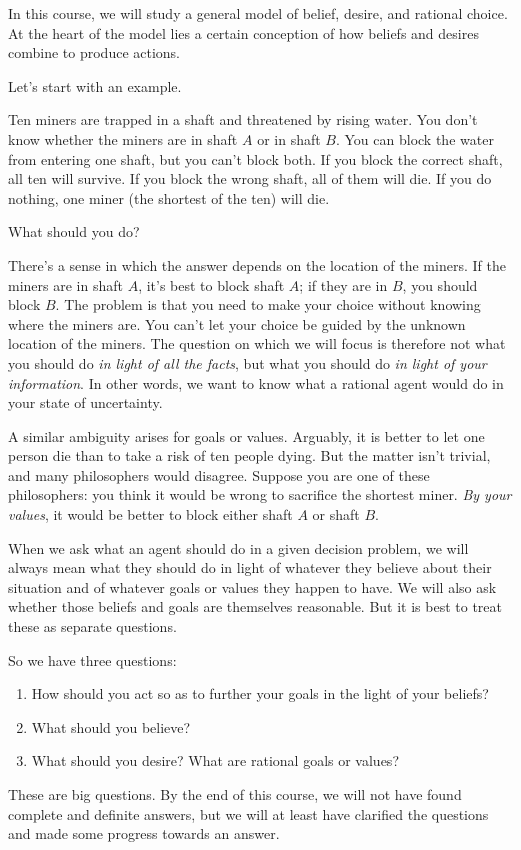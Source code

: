 In this course, we will study a general model of belief, desire, and
rational choice. At the heart of the model lies a certain conception
of how beliefs and desires combine to produce actions.

Let's start with an example.
%
\begin{example}\label{ex:miners}
  Ten miners are trapped in a shaft and threatened by rising water.
  You don't know whether the miners are in shaft $A$ or in shaft
  $B$. You can block the water from entering one shaft, but you can't
  block both. If you block the correct shaft, all ten will survive.
  If you block the wrong shaft, all of them will die. If you do
  nothing, one miner (the shortest of the ten) will die.
\end{example}

What should you do?

There's a sense in which the answer depends on the location of the
miners. If the miners are in shaft $A$, it's best to block shaft $A$;
if they are in $B$, you should block $B$. The problem is that you need
to make your choice without knowing where the miners are. You can't
let your choice be guided by the unknown location of the miners. The
question on which we will focus is therefore not what you should do
\emph{in light of all the facts}, but what you should do \emph{in
  light of your information}. In other words, we want to know what a
rational agent would do in your state of uncertainty.

A similar ambiguity arises for goals or values. Arguably, it is better
to let one person die than to take a risk of ten people dying. But the
matter isn't trivial, and many philosophers would disagree. Suppose
you are one of these philosophers: you think it would be wrong to
sacrifice the shortest miner. \emph{By your values}, it would be
better to block either shaft $A$ or shaft $B$.

When we ask what an agent should do in a given decision problem, we
will always mean what they should do in light of whatever they believe
about their situation and of whatever goals or values they happen to
have. We will also ask whether those beliefs and goals are themselves
reasonable. But it is best to treat these as separate questions.

So we have three questions:
\begin{enumerate}
  \itemsep0em 
\item How should you act so as to further your goals in the light of
  your beliefs?
\item What should you believe?
\item What should you desire? What are rational goals or values?
\end{enumerate}
These are big questions. By the end of this course, we will not have
found complete and definite answers, but we will at least have
clarified the questions and made some progress towards an answer.

